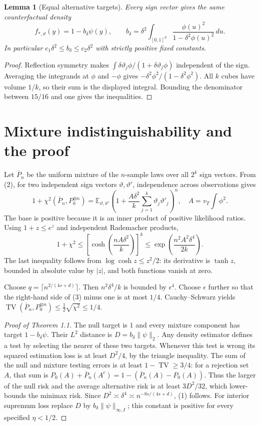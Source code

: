 \documentclass[11pt,a4paper]{article}
\newtheorem{lemma}[theorem]{Lemma}
\theoremstyle{remark}
\newcommand{\E}{\mathbb E}
\DeclareMathOperator{\TV}{TV}
\begin{document}
\begin{lemma}[Equal alternative targets]
Every sign vector gives the same counterfactual density
\[
 f_{*,\vartheta}(y)=1-b_\delta\psi(y),\qquad
 b_\delta=\delta^2\int_{[0,1]^d}
 \frac{\phi(u)^2}{1-\delta^2\phi(u)^2}\,du.
\]
In particular $c_1\delta^2\le b_\delta\le c_2\delta^2$ with strictly positive fixed constants.
\end{lemma}
\begin{proof}
Reflection symmetry makes $\int \delta\vartheta_j\phi/(1+\delta\vartheta_j\phi)$ independent of the sign. Averaging the integrands at $\phi$ and $-\phi$ gives $-\delta^2\phi^2/(1-\delta^2\phi^2)$. All $k$ cubes have volume $1/k$, so their sum is the displayed integral. Bounding the denominator between $15/16$ and one gives the inequalities.
\end{proof}

\section{Mixture indistinguishability and the proof}
Let $\overline P_n$ be the uniform mixture of the $n$-sample laws over all $2^k$ sign vectors. From (2), for two independent sign vectors $\vartheta,\vartheta'$, independence across observations gives
\[
 1+\chi^2(\overline P_n,P_0^{\otimes n})
 =\E_{\vartheta,\vartheta'}
 \left(1+\frac{A\delta^2}{k}\sum_{j=1}^k\vartheta_j\vartheta'_j\right)^n,
 \quad A=v_T\int\phi^2.
\]
The base is positive because it is an inner product of positive likelihood ratios. Using $1+z\le e^z$ and independent Rademacher products,
\[
 1+\chi^2\le
 \left[\cosh\left(\frac{nA\delta^2}{k}\right)\right]^k
 \le \exp\left(\frac{n^2A^2\delta^4}{2k}\right). \tag{3}
\]
The last inequality follows from $\log\cosh z\le z^2/2$: its derivative is $\tanh z$, bounded in absolute value by $|z|$, and both functions vanish at zero.

Choose $q=\lceil n^{2/(4s+d)}\rceil$. Then $n^2\delta^4/k$ is bounded by $\epsilon^4$. Choose $\epsilon$ further so that the right-hand side of (3) minus one is at most $1/4$. Cauchy--Schwarz yields $\TV(\overline P_n,P_0^{\otimes n})\le\tfrac12\sqrt{\chi^2}\le1/4$.

\begin{proof}[Proof of Theorem 1.1]
The null target is $1$ and every mixture component has target $1-b_\delta\psi$. Their $L^2$ distance is $D=b_\delta\|\psi\|_2$. Any density estimator defines a test by selecting the nearer of these two targets. Whenever this test is wrong its squared estimation loss is at least $D^2/4$, by the triangle inequality. The sum of the null and mixture testing errors is at least $1-\TV\ge3/4$: for a rejection set $A$, that sum is $P_0(A)+\overline P_n(A^c)=1-(\overline P_n(A)-P_0(A))$.
Thus the larger of the null risk and the average alternative risk is at least $3D^2/32$, which lower-bounds the minimax risk. Since $D^2\asymp\delta^4\asymp n^{-8s/(4s+d)}$, (1) follows. For interior supremum loss replace $D$ by $b_\delta\|\psi\|_{\infty,I}$; this constant is positive for every specified $\eta<1/2$.
\end{proof}
\end{document}
